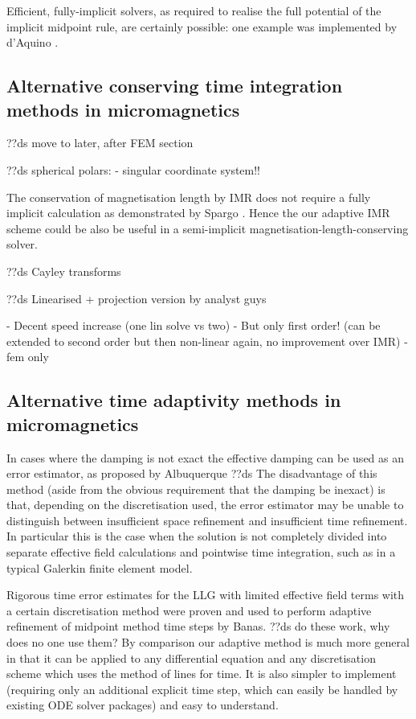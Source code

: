Efficient, fully-implicit solvers, as required to realise the full potential of the implicit midpoint rule, are certainly possible: one example was implemented by d'Aquino \etal.\cite{DAquino2005}


\subsection{Alternative conserving time integration methods in micromagnetics}

??ds move to later, after FEM section

??ds spherical polars:
- singular coordinate system!!

The conservation of magnetisation length by IMR does not require a fully implicit calculation as demonstrated by Spargo \etal\cite{Spargo2003a}.
Hence the our adaptive IMR scheme could be also be useful in a semi-implicit magnetisation-length-conserving solver.

??ds Cayley transforms

??ds Linearised + projection version by analyst guys

- Decent speed increase (one lin solve vs two)
- But only first order! (can be extended to second order but then non-linear again, no improvement over IMR)
- fem only


\subsection{Alternative time adaptivity methods in micromagnetics}
\label{sec:altern-time-adapt}

In cases where the damping is not exact the effective damping can be used as an error estimator, as proposed by Albuquerque \etal\cite{Albuquerque2001}
??ds The disadvantage of this method (aside from the obvious requirement that the damping be inexact) is that, depending on the discretisation used, the error estimator may be unable to distinguish between insufficient space refinement and insufficient time refinement.
In particular this is the case when the solution is not completely divided into separate effective field calculations and pointwise time integration, such as in a typical Galerkin finite element model.

Rigorous time error estimates for the LLG with limited effective field terms with a certain discretisation method were proven and used to perform adaptive refinement of midpoint method time steps by Banas.\cite{Banas-thesis}
??ds do these work, why does no one use them?
By comparison our adaptive method is much more general in that it can be applied to any differential equation and any discretisation scheme which uses the method of lines for time.
It is also simpler to implement (requiring only an additional explicit time step, which can easily be handled by existing ODE solver packages) and easy to understand.




